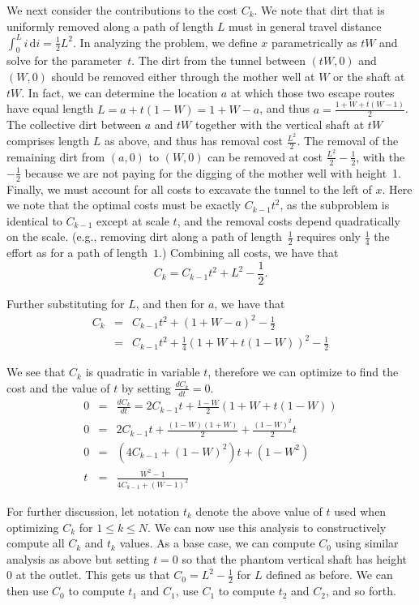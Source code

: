 \documentclass[12pt]{article}
\begin{document}
We next consider the contributions to the cost $C_k$. We note that
dirt that is uniformly removed along a path of length $L$ must in
general travel distance $\displaystyle \int_0^{L} i \, \mathrm{d}i
= \frac{1}{2}L^2$.
%
In analyzing the problem, we define $x$ parametrically as $tW$ and
solve for the parameter~$t$. The dirt from
the tunnel between $(tW,0)$ and $(W,0)$ should be removed either
through the mother well at $W$ or the shaft at $tW$. In fact, we can
determine the location $a$ at which those two escape
routes have equal length $L = a + t(1-W) = 1+W-a$,
and thus $a = \frac{1+W+t(W-1)}{2}$. The collective dirt between $a$
and $tW$ together with the vertical shaft at $tW$ comprises length $L$
as above, and thus has removal cost $\frac{L^2}{2}$. The removal of the
remaining dirt from $(a,0)$ to $(W,0)$ can be removed at cost
$\frac{L^2}{2} - \frac{1}{2}$, with the $-\frac{1}{2}$ because we are
not paying for the digging of the mother well with height~1.
Finally, we must account for all costs to excavate the tunnel to the
left of $x$. 
Here we note that the optimal costs must be exactly $C_{k-1} t^2$, as
the subproblem is identical to $C_{k-1}$ except at scale $t$, and the
removal costs depend quadratically on the scale. (e.g., removing dirt
along a path of length~$\frac{1}{2}$ requires only $\frac{1}{4}$ the
effort as for a path of length~$1$.) 
%
Combining all costs,
we have that
$$C_k = C_{k-1}t^2 + L^2 - \frac{1}{2}.$$

Further substituting for $L$, and then for $a$, we have that
%
\begin{eqnarray*}
C_k & = & C_{k-1}t^2 + (1+W-a)^2 - \frac{1}{2}\\
    & = & C_{k-1}t^2 + \frac{1}{4}\left(1+W+t(1-W)\right)^2 - \frac{1}{2}
\end{eqnarray*}

We see that $C_k$ is quadratic in variable $t$, therefore we can
optimize to find the cost and the value of $t$ by setting
$\frac{dC_k}{dt} = 0$.
\begin{eqnarray*}
0 & = & \frac{dC_k}{dt} = 2C_{k-1}t + \frac{1-W}{2}(1+W+t(1-W))\\
0 & = & 2C_{k-1}t + \frac{(1-W)(1+W)}{2} + \frac{(1-W)^2}{2}t\\
0 & = & \left(4C_{k-1}+(1-W)^2\right)t + (1-W^2)\\
t & = & \frac{W^2-1}{4C_{k-1} + (W-1)^2}
\end{eqnarray*}

For further discussion, let notation $t_k$ denote the above value of
$t$ used when optimizing $C_k$ for $1 \leq k \leq N$. We can now  use
this analysis to constructively compute all $C_k$ and $t_k$ values.
As a base case, we can compute $C_0$ using similar analysis as above
but setting $t=0$ so that the phantom vertical shaft has height 0 at
the outlet. This gets us that $C_0 = L^2 - \frac{1}{2}$ for $L$
defined as before. We
can then use $C_0$ to compute $t_1$ and $C_1$, use $C_1$ to
compute $t_2$ and $C_2$, and so forth.
\end{document}
